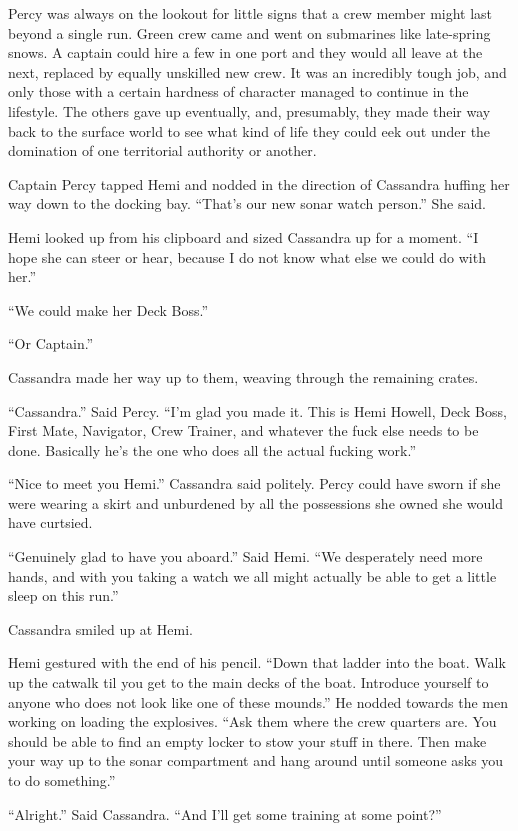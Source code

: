 \documentclass[
]{scrbook}
\begin{document}
Percy was always on the lookout for little signs that a crew member
might last beyond a single run. Green crew came and went on submarines
like late-spring snows. A captain could hire a few in one port and they
would all leave at the next, replaced by equally unskilled new crew. It
was an incredibly tough job, and only those with a certain hardness of
character managed to continue in the lifestyle. The others gave up
eventually, and, presumably, they made their way back to the surface
world to see what kind of life they could eek out under the domination
of one territorial authority or another.

Captain Percy tapped Hemi and nodded in the direction of Cassandra
huffing her way down to the docking bay. ``That's our new sonar watch
person.'' She said.

Hemi looked up from his clipboard and sized Cassandra up for a moment.
``I hope she can steer or hear, because I do not know what else we could
do with her.''

``We could make her Deck Boss.''

``Or Captain.''

Cassandra made her way up to them, weaving through the remaining crates.

``Cassandra.'' Said Percy. ``I'm glad you made it. This is Hemi Howell,
Deck Boss, First Mate, Navigator, Crew Trainer, and whatever the fuck
else needs to be done. Basically he's the one who does all the actual
fucking work.''

``Nice to meet you Hemi.'' Cassandra said politely. Percy could have
sworn if she were wearing a skirt and unburdened by all the possessions
she owned she would have curtsied.

``Genuinely glad to have you aboard.'' Said Hemi. ``We desperately need
more hands, and with you taking a watch we all might actually be able to
get a little sleep on this run.''

Cassandra smiled up at Hemi.

Hemi gestured with the end of his pencil. ``Down that ladder into the
boat. Walk up the catwalk til you get to the main decks of the boat.
Introduce yourself to anyone who does not look like one of these
mounds.'' He nodded towards the men working on loading the explosives.
``Ask them where the crew quarters are. You should be able to find an
empty locker to stow your stuff in there. Then make your way up to the
sonar compartment and hang around until someone asks you to do
something.''

``Alright.'' Said Cassandra. ``And I'll get some training at some
point?''
\end{document}
